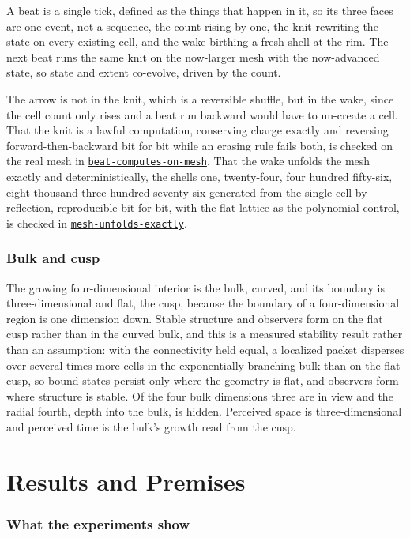 \documentclass{article}
\newcommand{\code}[2]{\href{https://github.com/cluesurf/vibe/blob/make/#1}{\texttt{#2}}}
\begin{document}
A beat is a single tick, defined as the things that happen in it, so its three faces are one
event, not a sequence, the count rising by one, the knit rewriting the state on every existing
cell, and the wake birthing a fresh shell at the rim. The next beat runs the same knit on the
now-larger mesh with the now-advanced state, so state and extent co-evolve, driven by the count.

The arrow is not in the knit, which is a reversible shuffle, but in the wake, since the cell count
only rises and a beat run backward would have to un-create a cell. That the knit is a lawful
computation, conserving charge exactly and reversing forward-then-backward bit for bit while an
erasing rule fails both, is checked on the real mesh in
\code{test/experiment/foundations/beat-computes-on-mesh.ts}{beat-computes-on-mesh}. That the wake
unfolds the mesh exactly and deterministically, the shells one, twenty-four, four hundred
fifty-six, eight thousand three hundred seventy-six generated from the single cell by reflection,
reproducible bit for bit, with the flat lattice as the polynomial control, is checked in
\code{test/experiment/geometry/mesh-unfolds-exactly.ts}{mesh-unfolds-exactly}.

\section{Bulk and cusp}

The growing four-dimensional interior is the bulk, curved, and its boundary is three-dimensional
and flat, the cusp, because the boundary of a four-dimensional region is one dimension down. Stable
structure and observers form on the flat cusp rather than in the curved bulk, and this is a
measured stability result rather than an assumption: with the connectivity held equal, a localized
packet disperses over several times more cells in the exponentially branching bulk than on the
flat cusp, so bound states persist only where the geometry is flat, and observers form where
structure is stable. Of the four bulk dimensions three are in view and the radial fourth, depth
into the bulk, is hidden. Perceived space is three-dimensional and perceived time is the bulk's
growth read from the cusp.

\part{Results and Premises}

\section{What the experiments show}
\end{document}
